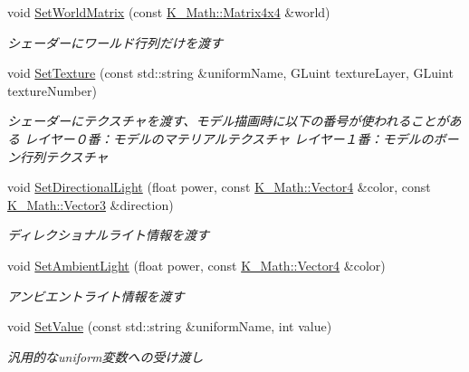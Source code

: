 \begin{DoxyCompactItemize}
void \mbox{\hyperlink{class_k___graphics_1_1_shader_class_ac697b99c625ac51a2dfeb01b85858506}{Set\+World\+Matrix}} (const \mbox{\hyperlink{namespace_k___math_a345271af9d32dff2c964bc679b13b45c}{K\+\_\+\+Math\+::\+Matrix4x4}} \&world)
\begin{DoxyCompactList}\small\item\em シェーダーにワールド行列だけを渡す \end{DoxyCompactList}\item 
void \mbox{\hyperlink{class_k___graphics_1_1_shader_class_a9d8fd3a0ab36010e685eecd735e6d296}{Set\+Texture}} (const std\+::string \&uniform\+Name, G\+Luint texture\+Layer, G\+Luint texture\+Number)
\begin{DoxyCompactList}\small\item\em シェーダーにテクスチャを渡す、モデル描画時に以下の番号が使われることがある レイヤー０番：モデルのマテリアルテクスチャ レイヤー１番：モデルのボーン行列テクスチャ \end{DoxyCompactList}\item 
void \mbox{\hyperlink{class_k___graphics_1_1_shader_class_a7a28da0b8fc149324d904150b711c397}{Set\+Directional\+Light}} (float power, const \mbox{\hyperlink{namespace_k___math_a8d82de9de17eae460600de1e40e8a01f}{K\+\_\+\+Math\+::\+Vector4}} \&color, const \mbox{\hyperlink{namespace_k___math_a66884d78082c39ada4091c211f3570f8}{K\+\_\+\+Math\+::\+Vector3}} \&direction)
\begin{DoxyCompactList}\small\item\em ディレクショナルライト情報を渡す \end{DoxyCompactList}\item 
void \mbox{\hyperlink{class_k___graphics_1_1_shader_class_acc9f55081fe01121e1010cd4754d5214}{Set\+Ambient\+Light}} (float power, const \mbox{\hyperlink{namespace_k___math_a8d82de9de17eae460600de1e40e8a01f}{K\+\_\+\+Math\+::\+Vector4}} \&color)
\begin{DoxyCompactList}\small\item\em アンビエントライト情報を渡す \end{DoxyCompactList}\item 
void \mbox{\hyperlink{class_k___graphics_1_1_shader_class_aa7151894bd962351e929e43f81490abe}{Set\+Value}} (const std\+::string \&uniform\+Name, int value)
\begin{DoxyCompactList}\small\item\em 汎用的なuniform変数への受け渡し \end{DoxyCompactList}\item 

\end{DoxyCompactItemize}
